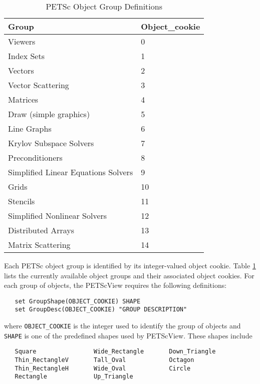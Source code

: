\begin{table}
\begin{center}
\begin{tabular}{||l||l||} \hline
{\bf Group}                              & {\bf Object\_cookie} \\
\hline
Viewers                            &  0 \\
Index Sets                         &  1 \\
Vectors                            &  2 \\
Vector Scattering                  &  3 \\
Matrices                           &  4 \\
Draw (simple graphics)             &  5 \\
Line Graphs                        &  6 \\
Krylov Subspace Solvers            &  7 \\
Preconditioners                    &  8 \\
Simplified Linear Equations Solvers     &  9 \\
Grids                              & 10 \\
Stencils                           & 11 \\
Simplified Nonlinear Solvers       & 12 \\
Distributed Arrays                 & 13 \\
Matrix Scattering                  & 14 \\
\hline
\end{tabular}
\end{center}
\caption{PETSc Object Group Definitions}
\label{PETSc_object_definitions}
\end{table}

Each PETSc object group is identified by its integer-valued object
cookie.  Table \ref{PETSc_object_definitions} lists the
currently available object groups and their associated object cookies.
For each group of objects, the PETScView requires the following
definitions:
\begin{verbatim}
   set GroupShape(OBJECT_COOKIE) SHAPE 
   set GroupDesc(OBJECT_COOKIE) "GROUP DESCRIPTION"
\end{verbatim}
where {\tt OBJECT\_COOKIE} is the integer used to identify the group
of objects and {\tt SHAPE} is one of the predefined shapes used by
PETScView.  These shapes include
\begin{verbatim}
   Square                Wide_Rectangle       Down_Triangle
   Thin_RectangleV       Tall_Oval            Octagon
   Thin_RectangleH       Wide_Oval            Circle
   Rectangle             Up_Triangle
\end{verbatim}

